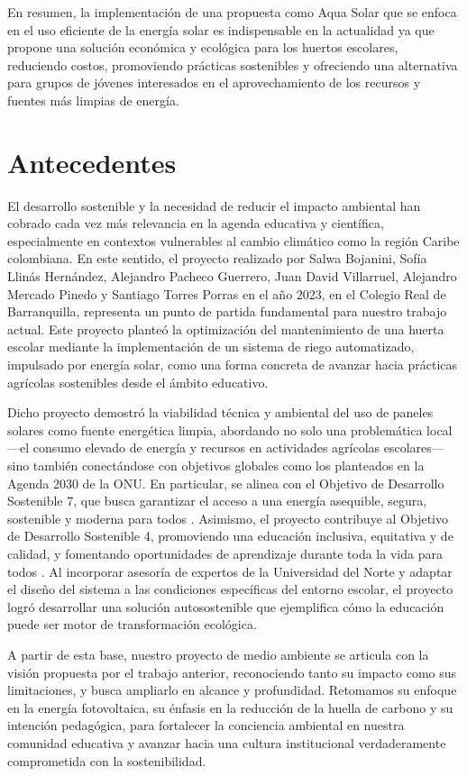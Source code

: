 \documentclass[12pt]{article}
\begin{document}
En resumen, la implementación de una propuesta como Aqua Solar que se enfoca en el uso eficiente de la energía solar es indispensable en la actualidad ya que propone una solución económica y ecológica para los huertos escolares, reduciendo costos, promoviendo prácticas sostenibles y ofreciendo una alternativa para grupos de jóvenes interesados en el aprovechamiento de los recursos y fuentes más limpias de energía.
\newpage
\section{Antecedentes}
El desarrollo sostenible y la necesidad de reducir el impacto ambiental han cobrado cada vez más relevancia en la agenda educativa y científica, especialmente en contextos vulnerables al cambio climático como la región Caribe colombiana. En este sentido, el proyecto realizado por Salwa Bojanini, Sofía Llinás Hernández, Alejandro Pacheco Guerrero, Juan David Villarruel, Alejandro Mercado Pinedo y Santiago Torres Porras en el año 2023, en el Colegio Real de Barranquilla, representa un punto de partida fundamental para nuestro trabajo actual. Este proyecto planteó la optimización del mantenimiento de una huerta escolar mediante la implementación de un sistema de riego automatizado, impulsado por energía solar, como una forma concreta de avanzar hacia prácticas agrícolas sostenibles desde el ámbito educativo.

Dicho proyecto demostró la viabilidad técnica y ambiental del uso de paneles solares como fuente energética limpia, abordando no solo una problemática local —el consumo elevado de energía y recursos en actividades agrícolas escolares— sino también conectándose con objetivos globales como los planteados en la Agenda 2030 de la ONU. En particular, se alinea con el Objetivo de Desarrollo Sostenible 7, que busca garantizar el acceso a una energía asequible, segura, sostenible y moderna para todos \cite{turn0search0}. Asimismo, el proyecto contribuye al Objetivo de Desarrollo Sostenible 4, promoviendo una educación inclusiva, equitativa y de calidad, y fomentando oportunidades de aprendizaje durante toda la vida para todos \cite{turn0search2}. Al incorporar asesoría de expertos de la Universidad del Norte y adaptar el diseño del sistema a las condiciones específicas del entorno escolar, el proyecto logró desarrollar una solución autosostenible que ejemplifica cómo la educación puede ser motor de transformación ecológica.


A partir de esta base, nuestro proyecto de medio ambiente se articula con la visión propuesta por el trabajo anterior, reconociendo tanto su impacto como sus limitaciones, y busca ampliarlo en alcance y profundidad. Retomamos su enfoque en la energía fotovoltaica, su énfasis en la reducción de la huella de carbono y su intención pedagógica, para fortalecer la conciencia ambiental en nuestra comunidad educativa y avanzar hacia una cultura institucional verdaderamente comprometida con la sostenibilidad.
\end{document}
